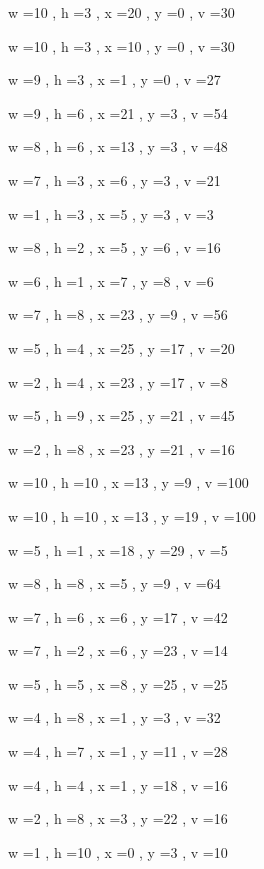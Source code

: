 \documentclass[11pt]{article}
\begin{document}


w =10 , h =3 , x =20 , y =0 , v =30
\par
w =10 , h =3 , x =10 , y =0 , v =30
\par
w =9 , h =3 , x =1 , y =0 , v =27
\par
w =9 , h =6 , x =21 , y =3 , v =54
\par
w =8 , h =6 , x =13 , y =3 , v =48
\par
w =7 , h =3 , x =6 , y =3 , v =21
\par
w =1 , h =3 , x =5 , y =3 , v =3
\par
w =8 , h =2 , x =5 , y =6 , v =16
\par
w =6 , h =1 , x =7 , y =8 , v =6
\par
w =7 , h =8 , x =23 , y =9 , v =56
\par
w =5 , h =4 , x =25 , y =17 , v =20
\par
w =2 , h =4 , x =23 , y =17 , v =8
\par
w =5 , h =9 , x =25 , y =21 , v =45
\par
w =2 , h =8 , x =23 , y =21 , v =16
\par
w =10 , h =10 , x =13 , y =9 , v =100
\par
w =10 , h =10 , x =13 , y =19 , v =100
\par
w =5 , h =1 , x =18 , y =29 , v =5
\par
w =8 , h =8 , x =5 , y =9 , v =64
\par
w =7 , h =6 , x =6 , y =17 , v =42
\par
w =7 , h =2 , x =6 , y =23 , v =14
\par
w =5 , h =5 , x =8 , y =25 , v =25
\par
w =4 , h =8 , x =1 , y =3 , v =32
\par
w =4 , h =7 , x =1 , y =11 , v =28
\par
w =4 , h =4 , x =1 , y =18 , v =16
\par
w =2 , h =8 , x =3 , y =22 , v =16
\par
w =1 , h =10 , x =0 , y =3 , v =10
\par
\newpage
\end{document}
